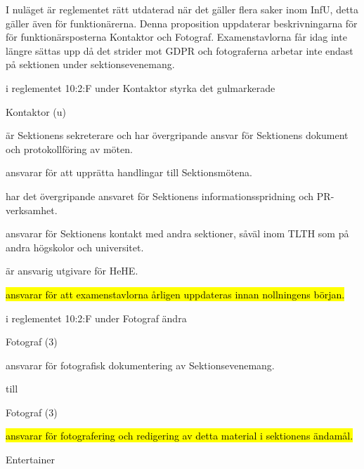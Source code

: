 \documentclass[../_main/handlingar.tex]{subfiles}
\begin{document}

I nuläget är reglementet rätt utdaterad när det gäller flera saker inom InfU, detta gäller även för funktionärerna. Denna proposition uppdaterar beskrivningarna för för funktionärsposterna Kontaktor och Fotograf. Examenstavlorna får idag inte längre sättas upp då det strider mot GDPR och fotograferna arbetar inte endast på sektionen under sektionsevenemang.

\begin{attsatser}
     \att i reglementet 10:2:F under Kontaktor styrka det gulmarkerade
        \begin{emptylist}
            \item Kontaktor (u)
            \begin{dashlist}
                \item är Sektionens sekreterare och har övergripande ansvar för Sektionens dokument och protokollföring av möten.
                \item ansvarar för att upprätta handlingar till Sektionsmötena.
                \item har det övergripande ansvaret för Sektionens informationsspridning och PR-verksamhet. 
                \item ansvarar för Sektionens kontakt med andra sektioner, såväl inom TLTH som på andra högskolor och universitet. 
                \item är ansvarig utgivare för HeHE.
                \item \hl{ansvarar för att examenstavlorna årligen uppdateras innan nollningens början.} 
            \end{dashlist}
        \end{emptylist}

    \att i reglementet 10:2:F under Fotograf ändra

    \begin{emptylist}
            \item Fotograf (3)
            \begin{dashlist}
                \item ansvarar för fotografisk dokumentering av Sektionsevenemang.
            \end{dashlist}
        \end{emptylist}

        till

    \begin{emptylist}
     \item Fotograf (3)
            \begin{dashlist}
                \item \hl{ansvarar för fotografering och redigering av detta material i sektionens ändamål.}
            \end{dashlist}
        \end{emptylist}



\end{attsatser}

\begin{signatures}{1}
    \ist
    \signature{\ent}{Entertainer}
\end{signatures}
\end{document}
